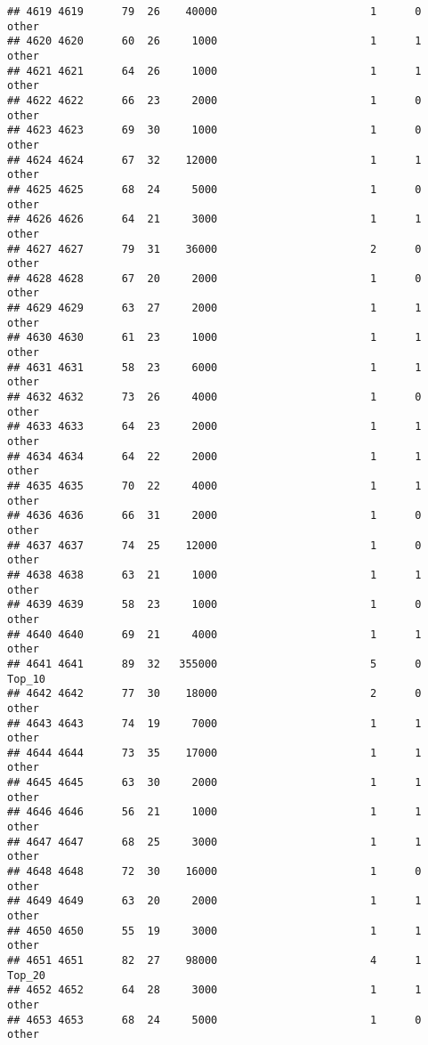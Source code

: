 \documentclass[
]{article}
\begin{document}
\begin{verbatim}
## 4619 4619      79  26    40000                        1      0    other
## 4620 4620      60  26     1000                        1      1    other
## 4621 4621      64  26     1000                        1      1    other
## 4622 4622      66  23     2000                        1      0    other
## 4623 4623      69  30     1000                        1      0    other
## 4624 4624      67  32    12000                        1      1    other
## 4625 4625      68  24     5000                        1      0    other
## 4626 4626      64  21     3000                        1      1    other
## 4627 4627      79  31    36000                        2      0    other
## 4628 4628      67  20     2000                        1      0    other
## 4629 4629      63  27     2000                        1      1    other
## 4630 4630      61  23     1000                        1      1    other
## 4631 4631      58  23     6000                        1      1    other
## 4632 4632      73  26     4000                        1      0    other
## 4633 4633      64  23     2000                        1      1    other
## 4634 4634      64  22     2000                        1      1    other
## 4635 4635      70  22     4000                        1      1    other
## 4636 4636      66  31     2000                        1      0    other
## 4637 4637      74  25    12000                        1      0    other
## 4638 4638      63  21     1000                        1      1    other
## 4639 4639      58  23     1000                        1      0    other
## 4640 4640      69  21     4000                        1      1    other
## 4641 4641      89  32   355000                        5      0   Top_10
## 4642 4642      77  30    18000                        2      0    other
## 4643 4643      74  19     7000                        1      1    other
## 4644 4644      73  35    17000                        1      1    other
## 4645 4645      63  30     2000                        1      1    other
## 4646 4646      56  21     1000                        1      1    other
## 4647 4647      68  25     3000                        1      1    other
## 4648 4648      72  30    16000                        1      0    other
## 4649 4649      63  20     2000                        1      1    other
## 4650 4650      55  19     3000                        1      1    other
## 4651 4651      82  27    98000                        4      1   Top_20
## 4652 4652      64  28     3000                        1      1    other
## 4653 4653      68  24     5000                        1      0    other

\end{verbatim}
\end{document}
